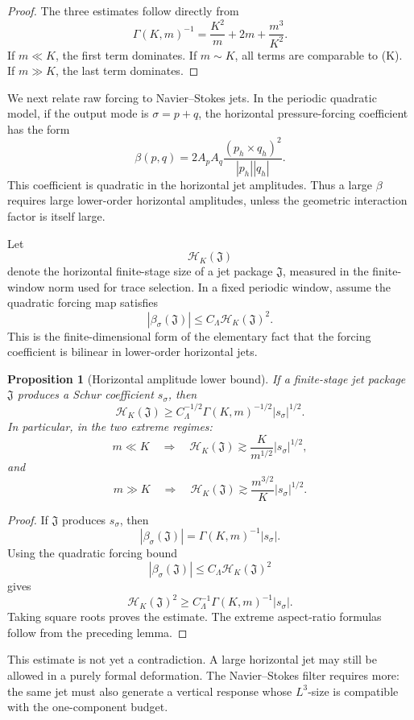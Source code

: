 \documentclass[11pt]{article}
\numberwithin{equation}{section}
\newtheorem{proposition}[theorem]{Proposition}
\begin{document}
\begin{proof}
The three estimates follow directly from
\[
\Gamma(K,m)^{-1} =
\frac{K^2}{m}+2m+\frac{m^3}{K^2}.
\]
If \(m\ll K\), the first term dominates. If \(m\sim K\), all terms are comparable to (K). If \(m\gg K\), the last term dominates.
\end{proof}

We next relate raw forcing to Navier--Stokes jets. In the periodic quadratic model, if the output mode is \(\sigma=p+q\), the horizontal pressure-forcing coefficient has the form
\[
\beta(p,q) =
2A_pA_q
\frac{(p_h\times q_h)^2}{|p_h||q_h|}.
\]
This coefficient is quadratic in the horizontal jet amplitudes. Thus a large \(\beta\) requires large lower-order horizontal amplitudes, unless the geometric interaction factor is itself large.

Let
\[
\mathcal H_K(\mathfrak J)
\]
denote the horizontal finite-stage size of a jet package \(\mathfrak J\), measured in the finite-window norm used for trace selection. In a fixed periodic window, assume the quadratic forcing map satisfies
\[
|\beta_\sigma(\mathfrak J)|
\le
C_\Lambda
\mathcal H_K(\mathfrak J)^2.
\]
This is the finite-dimensional form of the elementary fact that the forcing coefficient is bilinear in lower-order horizontal jets.

\begin{proposition}[Horizontal amplitude lower bound]
If a finite-stage jet package \(\mathfrak J\) produces a Schur coefficient \(s_\sigma\), then
\[
\mathcal H_K(\mathfrak J)
\ge
C_\Lambda^{-1/2}
\Gamma(K,m)^{-1/2}|s_\sigma|^{1/2}.
\]
In particular, in the two extreme regimes:
\[
m\ll K
\quad\Longrightarrow\quad
\mathcal H_K(\mathfrak J)
\gtrsim
\frac{K}{m^{1/2}}|s_\sigma|^{1/2},
\]
and
\[
m\gg K
\quad\Longrightarrow\quad
\mathcal H_K(\mathfrak J)
\gtrsim
\frac{m^{3/2}}{K}|s_\sigma|^{1/2}.
\]
\end{proposition}

\begin{proof}
If \(\mathfrak J\) produces \(s_\sigma\), then
\[
|\beta_\sigma(\mathfrak J)| =
\Gamma(K,m)^{-1}|s_\sigma|.
\]
Using the quadratic forcing bound
\[
|\beta_\sigma(\mathfrak J)|
\le
C_\Lambda\mathcal H_K(\mathfrak J)^2
\]
gives
\[
\mathcal H_K(\mathfrak J)^2
\ge
C_\Lambda^{-1}
\Gamma(K,m)^{-1}|s_\sigma|.
\]
Taking square roots proves the estimate. The extreme aspect-ratio formulas follow from the preceding lemma.
\end{proof}

This estimate is not yet a contradiction. A large horizontal jet may still be allowed in a purely formal deformation. The Navier--Stokes filter requires more: the same jet must also generate a vertical response whose \(L^3\)-size is compatible with the one-component budget.
\end{document}
